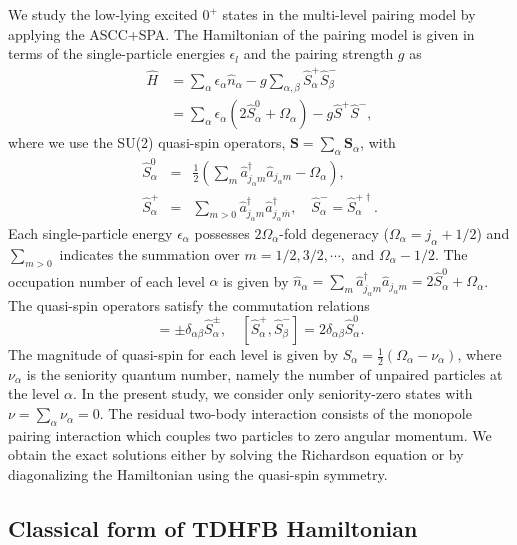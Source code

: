 \documentclass[%
superscriptaddress,
showpacs,
nofootinbib,
amsmath,amssymb,
aps,
prc,
twocolumn,
floatfix ]%
{revtex4-1}
\begin{document}
We study the low-lying excited $0^+$ states
in the multi-level pairing model by applying the ASCC+SPA.
The Hamiltonian of the pairing model is given in terms of
the single-particle energies $\epsilon_l$ and the pairing strength $g$ as
\begin{align}
	\hat{H} &= \sum_\alpha \epsilon_\alpha \hat{n}_\alpha - g \sum_{\alpha,\beta} \hat{S}_\alpha^+ \hat{S}_{\beta}^- \nonumber \\
    &= \sum_\alpha\epsilon_\alpha(2\hat{S}_\alpha^0+\Omega_\alpha) - g \hat{S}^+ \hat{S}^{-} ,
\end{align}
where we use the SU(2) quasi-spin operators,
$\boldsymbol{S}=\sum_\alpha \boldsymbol{S}_\alpha$, with
\begin{eqnarray}
        \hat{S}_\alpha^0 &=& \frac{1}{2}\left(\sum_m\hat{a}_{j_\alpha m}^{\dag}\hat{a}_{j_\alpha m}-\Omega_\alpha\right) ,\\
        \hat{S}_\alpha^{+} &=& \sum_{m>0}\hat{a}_{j_\alpha m}^{\dag}\hat{a}_{j_\alpha\overline{m}}^{\dag} ,
\quad   \hat{S}_\alpha^{-} = \hat{S}_\alpha^{+\dag} .
\end{eqnarray}
Each single-particle energy $\epsilon_\alpha$ possesses $2\Omega_\alpha$-fold
degeneracy ($\Omega_\alpha=j_\alpha+1/2$)
and $\sum_{m>0}$ indicates the summation over $m=1/2,3/2,\cdots,$
and $\Omega_\alpha-1/2$.
The occupation number of each level $\alpha$ is given by
$\hat{n}_\alpha = \sum_m \hat{a}^{\dag}_{j_\alpha m}\hat{a}_{j_\alpha m}
=2\hat{S}_\alpha^0+\Omega_\alpha
$.
The quasi-spin operators satisfy the commutation relations
\begin{equation}
  [\hat{S}_\alpha^0,\hat{S}_\beta^{\pm}] = \pm\delta_{\alpha\beta}\hat{S}_{\alpha}^{\pm},
\quad [\hat{S}_{\alpha}^{+},\hat{S}_{\beta}^{-}] = 2\delta_{\alpha\beta}\hat{S}_{\alpha}^{0} .
\end{equation}
The magnitude of quasi-spin for each level is given by
$S_\alpha=\frac{1}{2}(\Omega_\alpha-\nu_\alpha)$, where $\nu_\alpha$
is the seniority
quantum number, namely the number of unpaired particles at the level $\alpha$.
In the present study, we consider only seniority-zero states with
$\nu=\sum_\alpha \nu_\alpha=0$.
The residual two-body interaction consists of the monopole pairing
interaction which couples two particles to zero angular momentum.
We obtain the exact solutions either by solving the Richardson equation
\cite{Richardson,Richardson2,Richardson3} or
by diagonalizing the Hamiltonian using the quasi-spin symmetry.


\subsection{Classical form of TDHFB Hamiltonian}
\end{document}
